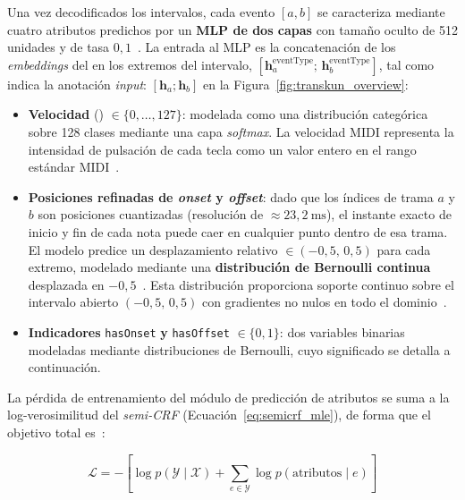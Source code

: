\documentclass[11pt,spanish,listoffigures,listoftables]{tfgetsinf}
\begin{document}
Una vez decodificados los intervalos, cada evento $[a, b]$ se caracteriza mediante
cuatro atributos predichos por un \textbf{MLP de dos capas} con tamaño oculto de
512 unidades y  de tasa $0{,}1$~\cite{yan2024transkun}.
La entrada al MLP es la concatenación de los \textit{embeddings} del
 en los extremos del intervalo,
$[\boldsymbol{h}_a^{\text{eventType}};\,\boldsymbol{h}_b^{\text{eventType}}]$,
tal como indica la anotación \textit{input}: $[\mathbf{h}_a; \mathbf{h}_b]$ en la
Figura~\ref{fig:transkun_overview}:

\begin{itemize}
  \item \textbf{Velocidad} () $\in \{0, \ldots, 127\}$:
  modelada como una distribución categórica sobre 128 clases mediante una capa
  \textit{softmax}. La velocidad MIDI representa la intensidad de pulsación de cada
  tecla como un valor entero en el rango estándar MIDI~\cite{yan2024transkun}.

  \item \textbf{Posiciones refinadas de \textit{onset} y \textit{offset}}: dado que los índices de
  trama $a$ y $b$ son posiciones cuantizadas (resolución de $\approx
  23{,}2~\mathrm{ms}$), el instante exacto de inicio y fin de cada nota puede caer
  en cualquier punto dentro de esa trama. El modelo predice un desplazamiento
  relativo $\in (-0{,}5,\, 0{,}5)$ para cada extremo, modelado mediante una
  \textbf{distribución de Bernoulli continua} desplazada en
  $-0{,}5$~\cite{loaiza2019contbernoulli}. Esta distribución proporciona soporte
  continuo sobre el intervalo abierto $(-0{,}5,\, 0{,}5)$ con gradientes no nulos
  en todo el dominio~\cite{yan2024transkun}.

  \item \textbf{Indicadores} \texttt{hasOnset} \textbf{y} \texttt{hasOffset}
  $\in \{0, 1\}$: dos variables binarias modeladas mediante distribuciones de
  Bernoulli, cuyo significado se detalla a continuación.
\end{itemize}

La pérdida de entrenamiento del módulo de predicción de atributos se suma a la
log-verosimilitud del \textit{semi-CRF} (Ecuación~\ref{eq:semicrf_mle}), de forma que el
objetivo total es~\cite{yan2024transkun}:

\begin{equation}
  \mathcal{L} = -\left[\log p(\mathcal{Y} \mid \mathcal{X}) +
  \sum_{e \in \mathcal{Y}} \log p(\text{atributos} \mid e)\right]
  \label{eq:loss_total_transkun}
\end{equation}
\end{document}

